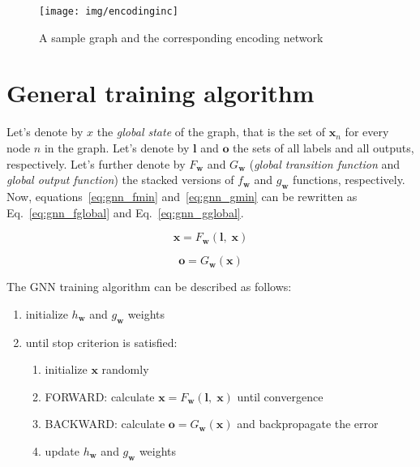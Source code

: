 \begin{figure}[h!]
\begin{center}
	\texttt{[image: img/encodinginc]}
	\caption{A sample graph and the corresponding encoding network}
	\label{fig:gnn_encoding}
\end{center}
\end{figure}


\section{General training algorithm}
Let's denote by $x$ the \emph{global state} of the graph, that is the set of $\bm{x}_n$ for every node $n$ in the graph. Let's denote by $\bm{l}$ and $\bm{o}$ the sets of all labels and all outputs, respectively. Let's further denote by $F_{\bm{w}}$ and $G_{\bm{w}}$ (\emph{global transition function} and \emph{global output function}) the stacked versions of $f_{\bm{w}}$ and $g_{\bm{w}}$ functions, respectively. Now, equations~\ref{eq:gnn_fmin} and~\ref{eq:gnn_gmin} can be rewritten as Eq.~\ref{eq:gnn_fglobal} and Eq.~\ref{eq:gnn_gglobal}.

\begin{equation}
\bm{x} = F_{\bm{w}}(\bm{l}, \; \bm{x})
\label{eq:gnn_fglobal}
\end{equation}

\begin{equation}
\bm{o} = G_{\bm{w}}(\bm{x})
\label{eq:gnn_gglobal}
\end{equation}

\noindent The GNN training algorithm can be described as follows:
\begin{enumerate}
	\item initialize $h_{\bm{w}}$ and $g_{\bm{w}}$ weights
	\item until stop criterion is satisfied:
	\begin{enumerate}
		\item initialize $\bm{x}$ randomly
		\item FORWARD: calculate $\bm{x} = F_{\bm{w}}(\bm{l}, \; \bm{x})$ until convergence
		\item BACKWARD: calculate $\bm{o} = G_{\bm{w}}(\bm{x})$ and backpropagate the error
		\item update $h_{\bm{w}}$ and $g_{\bm{w}}$ weights
	\end{enumerate}
\end{enumerate}


